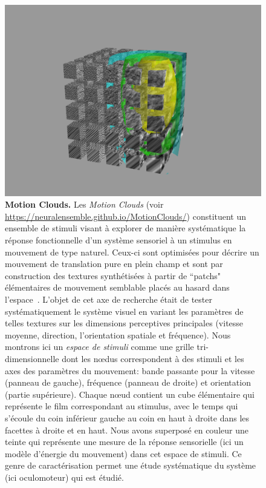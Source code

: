\documentclass[11pt,french,a4paper,oneside]{article}%
\begin{document}
\begin{figure}%
\centerline{\includegraphics[width=.9\linewidth]{MCartwork.png}}
\caption{\textbf{Motion Clouds.} Les \emph{Motion Clouds}  (voir \url{https://neuralensemble.github.io/MotionClouds/}) constituent un ensemble de stimuli visant à explorer de manière systématique la réponse fonctionnelle d'un système sensoriel à un stimulus en mouvement de type naturel. Ceux-ci sont optimisées pour décrire un mouvement de translation pure en plein champ et sont par construction des textures synthétisées à partir de ``patchs" élémentaires de mouvement semblable placés au hasard dans l'espace~\citep{Sanz12,Vacher15nips}. L'objet de cet axe de recherche était de tester systématiquement le système visuel en variant les paramètres de telles textures sur les dimensions perceptives principales (vitesse moyenne, direction, l'orientation spatiale et fréquence). Nous montrons ici un \emph{espace de stimuli} comme une grille tri-dimensionnelle dont les n\oe dus correspondent à des stimuli et les axes des paramètres du mouvement: bande passante pour la vitesse (panneau de gauche), fréquence (panneau de droite) et orientation (partie supérieure). Chaque n\oe ud contient un cube élémentaire qui représente le film correspondant au stimulus, avec le temps qui s'écoule du coin inférieur gauche au coin en haut à droite dans les facettes à droite et en haut. Nous avons superposé en couleur une teinte qui représente une mesure de la réponse sensorielle (ici un modèle d'énergie du mouvement) dans cet espace de stimuli. Ce genre de caractérisation permet une étude systématique du système (ici oculomoteur) qui est étudié.
 }%
\label{fig:motionclouds}%
\end{figure}%
\end{document}
